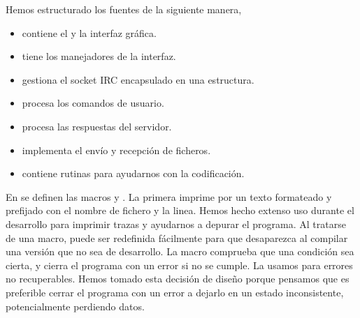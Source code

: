 \documentclass[12pt, a4paper]{memoriaeps}
\begin{document}

Hemos estructurado los fuentes de la siguiente manera,
\begin{itemize}
	\item {}      	contiene el  y la interfaz gráfica.
	\item {}	tiene los manejadores de la interfaz.
	\item {}    	gestiona el socket IRC encapsulado en una estructura.
	\item {} 	procesa los comandos de usuario.
	\item {} 	procesa las respuestas del servidor.
	\item {}	implementa el envío y recepción de ficheros.
	\item {}      	contiene rutinas para ayudarnos con la codificación.
\end{itemize}


En  se definen las macros  y . La primera imprime por  un texto formateado y prefijado con el nombre de fichero y la linea. Hemos hecho extenso uso durante el desarrollo para imprimir trazas y ayudarnos a depurar el programa.
Al tratarse de una macro, puede ser redefinida fácilmente para que desaparezca al compilar una versión que no sea de desarrollo. La macro  comprueba que una condición sea cierta, y cierra el programa con un error si no se cumple. La usamos para errores no recuperables. Hemos tomado esta decisión de diseño porque pensamos que es preferible cerrar el programa con un error a dejarlo en un estado inconsistente, potencialmente perdiendo datos.

\end{document}
